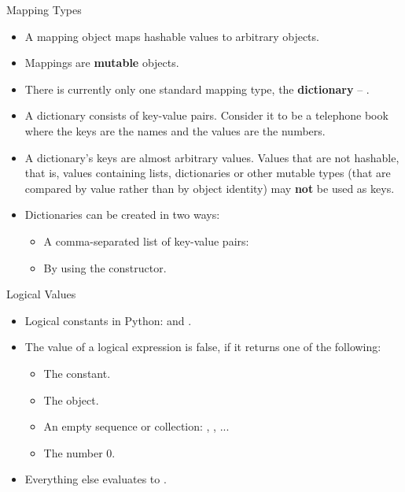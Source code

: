 \begin{dwHeaderFrame}{Mapping Types}
	\begin{itemize}
		\item A mapping object maps hashable values to arbitrary objects.
		\item Mappings are \textbf{mutable} objects.
		\item There is currently only one standard mapping type, the \textbf{dictionary} -- .
		\item A dictionary consists of key-value pairs. Consider it to be a telephone book where the keys are the names and the values are the numbers.
		\item A dictionary’s keys are almost arbitrary values. Values that are not hashable, that is, values containing lists,
			dictionaries or other mutable types (that are compared by value rather than by object identity) may \textbf{not} be used as keys.
		\item Dictionaries can be created in two ways:
		\begin{itemize}
			\item A comma-separated list of key-value pairs: 
			\item By using the  constructor.
		\end{itemize}
	\end{itemize}
\end{dwHeaderFrame}


\begin{frame}
	
\end{frame}



\begin{dwHeaderFrame}{Logical Values}
	\begin{itemize}
		\item Logical constants in Python:  and .
		\item The value of a logical expression is false, if it returns one of the following:
		\begin{itemize}
			\item The  constant.
			\item The  object.
			\item An empty sequence or collection: \code{[]}, \code{()},  ...
			\item The number 0.
		\end{itemize}
		\item Everything else evaluates to .
	\end{itemize}
\end{dwHeaderFrame}


